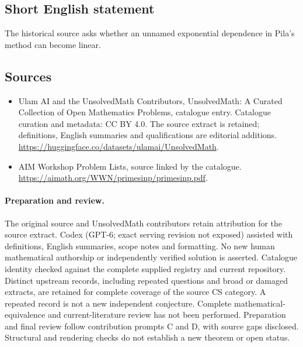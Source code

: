 \documentclass[11pt]{article}
\begin{document}
\subsection{Short English statement}
The historical source asks whether an unnamed exponential dependence in Pila's method can become linear.
\subsection{Sources}
\begin{itemize}
\item[\hypertarget{source:statement:1}{S1}] Ulam AI and the UnsolvedMath Contributors, UnsolvedMath: A Curated Collection of Open Mathematics Problems, catalogue entry. Catalogue curation and metadata: CC BY 4.0. The source extract is retained; definitions, English summaries and qualifications are editorial additions.
\url{https://huggingface.co/datasets/ulamai/UnsolvedMath}.
\item[\hypertarget{source:statement:2}{S2}] AIM Workshop Problem Lists, source linked by the catalogue.
\url{https://aimath.org/WWN/primesinp/primesinp.pdf}.
\end{itemize}
\paragraph{Preparation and review.}
The original source and UnsolvedMath contributors retain attribution for the source extract. Codex (GPT-6; exact serving revision not exposed) assisted with definitions, English summaries, scope notes and formatting. No new human mathematical authorship or independently verified solution is asserted. Catalogue identity checked against the complete supplied registry and current repository. Distinct upstream records, including repeated questions and broad or damaged extracts, are retained for complete coverage of the source CS category. A repeated record is not a new independent conjecture. Complete mathematical-equivalence and current-literature review has not been performed. Preparation and final review follow contribution prompts C and D, with source gaps disclosed. Structural and rendering checks do not establish a new theorem or open status.
\label{end:statement}
\end{document}

